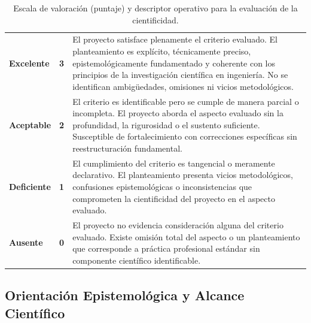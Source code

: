 \begin{table}[htbp]
\centering
\scriptsize
\caption{Escala de valoración (puntaje) y descriptor operativo para la evaluación de la cientificidad.}
\label{tab:escala-cientificidad}
\begin{tabularx}{\textwidth}{|C{2.8cm}|C{1cm}|X|}
\hline
{}
 &  &  \\ \hline
\textcolor{csuf}{\textbf{Excelente}} & \textbf{3} & El proyecto satisface plenamente el criterio evaluado. El planteamiento es explícito, técnicamente preciso, epistemológicamente fundamentado y coherente con los principios de la investigación científica en ingeniería. No se identifican ambigüedades, omisiones ni vicios metodológicos. \\ \hline
{}
\textcolor{cace}{\textbf{Aceptable}} & \textbf{2} & El criterio es identificable pero se cumple de manera parcial o incompleta. El proyecto aborda el aspecto evaluado sin la profundidad, la rigurosidad o el sustento suficiente. Susceptible de fortalecimiento con correcciones específicas sin reestructuración fundamental. \\ \hline
\textcolor{cdef}{\textbf{Deficiente}} & \textbf{1} & El cumplimiento del criterio es tangencial o meramente declarativo. El planteamiento presenta vicios metodológicos, confusiones epistemológicas o inconsistencias que comprometen la cientificidad del proyecto en el aspecto evaluado. \\ \hline
{}
\textcolor{cins}{\textbf{Ausente}} & \textbf{0} & El proyecto no evidencia consideración alguna del criterio evaluado. Existe omisión total del aspecto o un planteamiento que corresponde a práctica profesional estándar sin componente científico identificable. \\ \hline
\end{tabularx}
\end{table}

\clearpage
\subsection{Orientación Epistemológica y Alcance Científico}

